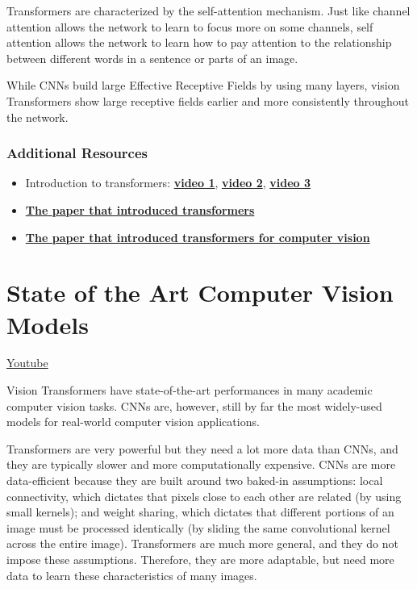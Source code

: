 Transformers are characterized by the self-attention mechanism. Just like channel attention allows the network to learn to focus more on some channels, self attention allows the network to learn how to pay attention to the relationship between different words in a sentence or parts of an image. \newline

While CNNs build large Effective Receptive Fields by using many layers, vision Transformers show large receptive fields earlier and more consistently throughout the network.

\subsubsection{Additional Resources}

\begin{itemize}
    \item Introduction to transformers: \href{https://www.youtube.com/watch?v=dichIcUZfOw}{\textbf{video 1}}, \href{https://www.youtube.com/watch?v=mMa2PmYJlCo}{\textbf{video 2}}, \href{https://www.youtube.com/watch?v=gJ9kaJsE78k&t=2s}{\textbf{video 3}}
    \item \href{https://arxiv.org/abs/1706.03762}{\textbf{The paper that introduced transformers}}
    \item \href{https://arxiv.org/abs/2010.11929}{\textbf{The paper that introduced transformers for computer vision}}
\end{itemize}

\section{State of the Art Computer Vision Models}
\href{https://www.youtube.com/watch?v=omAM78zhf3Y&ab_channel=Udacity}{Youtube} \newline

Vision Transformers have state-of-the-art performances in many academic computer vision tasks. CNNs are, however, still by far the most widely-used models for real-world computer vision applications.

Transformers are very powerful but they need a lot more data than CNNs, and they are typically slower and more computationally expensive. CNNs are more data-efficient because they are built around two baked-in assumptions: local connectivity, which dictates that pixels close to each other are related (by using small kernels); and weight sharing, which dictates that different portions of an image must be processed identically (by sliding the same convolutional kernel across the entire image). Transformers are much more general, and they do not impose these assumptions. Therefore, they are more adaptable, but need more data to learn these characteristics of many images.

